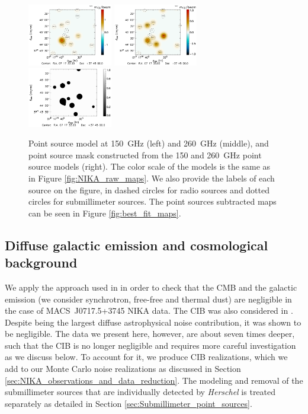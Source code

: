\documentclass[twocolumn,traditabstract]{aa}
\begin{document}
\begin{figure}[h]
\centering
\includegraphics[width=0.33\textwidth]{Figure/PSexp_ps_2mm.pdf}
\includegraphics[width=0.33\textwidth]{Figure/PSexp_ps_1mm.pdf}
\includegraphics[width=0.33\textwidth]{Figure/PSexp_mask.pdf}
\caption{\footnotesize{Point source model at 150~GHz (left) and 260~GHz (middle), and point source mask constructed from the 150 and 260~GHz point source models (right). The color scale of the models is the same as in Figure \ref{fig:NIKA_raw_maps}. We also provide the labels of each source on the figure, in dashed circles for radio sources and dotted circles for submillimeter sources. The point sources subtracted maps can be seen in Figure \ref{fig:best_fit_maps}.}}
\label{fig:point_source_modeling}
\end{figure}

\subsection{Diffuse galactic emission and cosmological background}\label{sec:Diffuse_galactic_emission_and_cosmological_background}
We apply the approach used in \cite{Adam2016} in order to check that the CMB and the galactic emission (we consider synchrotron, free-free and thermal dust) are negligible in the case of \mbox{MACS~J0717.5+3745} NIKA data. The CIB was also considered in \cite{Adam2016}. Despite being the largest diffuse astrophysical noise contribution, it was shown to be negligible. The data we present here, however, are about seven times deeper, such that the CIB is no longer negligible and requires more careful investigation as we discuss below. To account for it, we produce CIB realizations, which we add to our Monte Carlo noise realizations as discussed in Section \ref{sec:NIKA_observations_and_data_reduction}. The modeling and removal of the submillimeter sources that are individually detected by \textit{Herschel} is treated separately as detailed in Section \ref{sec:Submillimeter_point_sources}.
\end{document}
